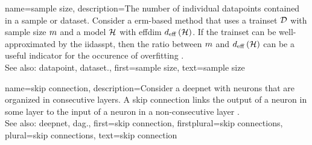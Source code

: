 {name={sample size},
	description={The number of individual \glspl{datapoint} contained in a 
	    \gls{sample} or \gls{dataset}. Consider a \gls{erm}-based method that uses a 
		\gls{trainset} $\mathcal{D}$ with sample size $m$ 
		and a \gls{model} $\mathcal{H}$ with \gls{effdim} $d_{\rm eff} \left( \mathcal{H} \right)$. If the \gls{trainset} can 
		be well-approximated by the \gls{iidasspt}, then the ratio between $m$ 
		and $d_{\rm eff} \left( \mathcal{H} \right)$ can be a useful indicator for the occurence of \gls{overfitting} \cite[Ch. 6]{MLBasics}.
				\\
		See also: \gls{datapoint}, \gls{dataset}.},
	first={sample size},
	text={sample size}
}

 {name={skip connection},
  description={Consider a \gls{deepnet} with neurons that are organized 
               in consecutive \glspl{layer}. A skip connection links the output of a neuron in 
			   some \gls{layer} to the input of a neuron in a non-consecutive \gls{layer} \cite{HeResidual2016}.\\
		See also: \gls{deepnet}, \gls{dag}.},
 	first={skip connection},
 	firstplural={skip connections}, 
 	plural={skip connections}, 
 	text={skip connection}
 }

